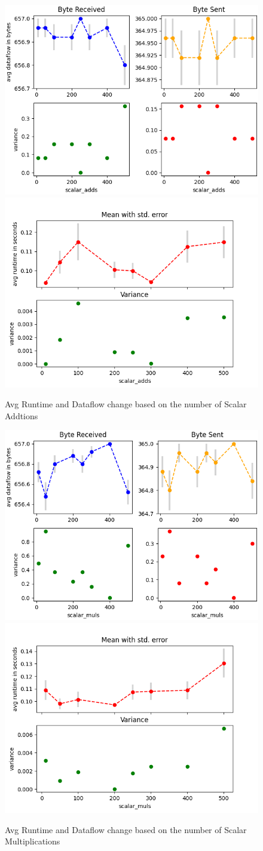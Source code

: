 \documentclass[10pt,conference,compsocconf]{IEEEtran}
\begin{document}
\begin{figure}[h!]
    \centering
    \includegraphics[width=0.49\linewidth]{../performance_analysis/dataflow_scalar_additions.png}
    \includegraphics[width=0.49\linewidth]{../performance_analysis/runtime_scalar_additions.png}
    \caption{Avg Runtime and Dataflow change based on the number of Scalar Addtions}
    \label{fig:scalar_add}
\end{figure}


\begin{figure}[h!]
    \centering
    \includegraphics[width=0.49\linewidth]{../performance_analysis/dataflow_scalar_multiplications.png}
    \includegraphics[width=0.49\linewidth]{../performance_analysis/runtime_scalar_multiplications.png}
    \caption{Avg Runtime and Dataflow change based on the number of Scalar Multiplications}
    \label{fig:scalar_mult}
\end{figure}
\end{document}
